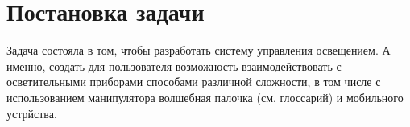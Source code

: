 \chapter{Постановка задачи}
\label{cha:Postanovka}
Задача состояла в том, чтобы разработать систему управления освещением. А именно, создать для пользователя возможность взаимодействовать с осветительными приборами способами различной сложности, в том числе с использованием манипулятора волшебная палочка (см. глоссарий) и мобильного устрйства. 
  